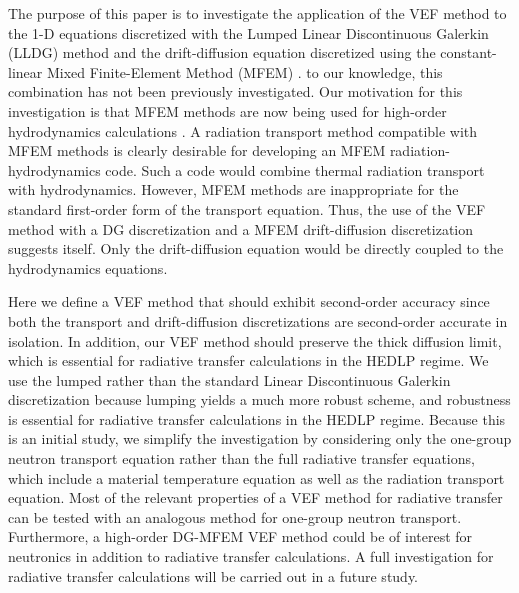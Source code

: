 The purpose of this paper is to investigate the application of the VEF method to the 1-D \SN equations 
discretized with the Lumped Linear Discontinuous Galerkin (LLDG) method and the drift-diffusion equation discretized using the 
constant-linear Mixed Finite-Element Method (MFEM) \cite{Raviart1977}.  to our knowledge, this  combination has not been previously 
investigated. Our motivation for this investigation is that MFEM methods are now being used for high-order hydrodynamics 
calculations \cite{blast}.  A radiation transport method compatible with MFEM 
methods is clearly desirable for developing an MFEM radiation-hydrodynamics code.  Such a code would combine thermal 
radiation transport with hydrodynamics.  However, MFEM methods are inappropriate for the standard first-order form of the 
transport equation.  Thus, the use of the VEF method with a DG \SN discretization and a MFEM drift-diffusion discretization 
suggests itself.  Only the drift-diffusion equation would be directly coupled to the hydrodynamics equations.

Here we define a VEF method that should exhibit second-order accuracy since both the transport and drift-diffusion 
discretizations are second-order accurate in isolation.  In addition, our VEF method should preserve the thick diffusion 
limit, which is essential for radiative transfer calculations in the HEDLP regime. We use the lumped 
rather than the standard Linear Discontinuous Galerkin discretization because lumping yields a much more robust scheme, and 
robustness is essential 
for radiative transfer calculations in the HEDLP regime.   Because this is an initial study, we simplify the investigation 
by considering only the one-group neutron transport equation rather than the full radiative transfer equations, which include a 
material temperature equation as well as the radiation transport equation.  Most of the relevant properties of  
a VEF method for radiative transfer can be tested with an analogous method for one-group neutron transport.  Furthermore, 
a high-order DG-MFEM VEF method could be of interest for neutronics in addition to radiative transfer calculations. 
A full investigation for radiative transfer calculations will be carried out in a future study. 

